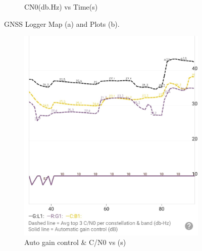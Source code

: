 \begin{figure}[htbp]
\begin{subfigure}{0.23\textwidth}
                \caption{CN0(db.Hz) vs Time(s)}
                \label{fig:gnsslogger_plots}
            \end{subfigure}
            \vspace{0.35cm}
            \caption{GNSS Logger Map (a) and Plots (b).}
            \label{fig:gnsslogger_1}
        \end{figure}

        \vspace{0.1cm}

        \begin{figure}[htbp]
            \centering
            \begin{subfigure}{0.23\textwidth}
                \centering
                \includegraphics[width=\textwidth]{images/screenshots/Screenshot_20250503_GnssLogger_spoof_jam.jpg}
                \caption{Auto gain control \& C/N0 vs (s)}
                \label{fig:gnsslogger_spoof_jam}
            \end{subfigure}
            \hfill
            \begin{subfigure}{0.23\textwidth}
                \centering

\end{subfigure}
\end{figure}
